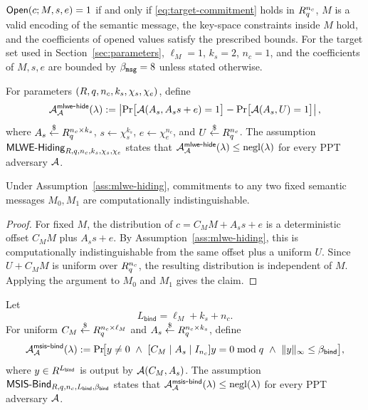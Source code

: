 \begin{definition}\label{def:target-open}
\(\mathsf{Open}(c;M,s,e)=1\) if and only if \eqref{eq:target-commitment} holds in \(R_q^{n_c}\), \(M\) is a valid
encoding of the semantic message, the key-space constraints inside \(M\) hold, and the coefficients of opened values
satisfy the prescribed bounds.  For the target set used in Section~\ref{sec:parameters}, \(\ell_M=1\), \(k_s=2\),
\(n_c=1\), and the coefficients of \(M,s,e\) are bounded by \(\beta_{\mathtt{msg}}=8\) unless stated otherwise.
\end{definition}

\begin{definition}\label{ass:mlwe-hiding}
For parameters \((R,q,n_c,k_s,\chi_s,\chi_e)\), define
\[
  \mathcal{A}^{\mathsf{mlwe\mbox{-}hide}}_{\mathcal{A}}(\lambda)
  :=
  \left|
    \Pr\bigl[\mathcal{A}(A_s,A_s s+e)=1\bigr]
    -
    \Pr\bigl[\mathcal{A}(A_s,U)=1\bigr]
  \right|,
\]
where \(A_s\overset{\$}{\leftarrow}R_q^{n_c\times k_s}\), \(s\leftarrow\chi_s^{k_s}\), \(e\leftarrow\chi_e^{n_c}\), and
\(U\overset{\$}{\leftarrow}R_q^{n_c}\).  The assumption
\(\mathsf{MLWE}\text{-}\mathsf{Hiding}_{R,q,n_c,k_s,\chi_s,\chi_e}\) states that
\(\mathcal{A}^{\mathsf{mlwe\mbox{-}hide}}_{\mathcal{A}}(\lambda)\le\mathrm{negl}(\lambda)\) for every PPT adversary \(\mathcal{A}\).
\end{definition}

\begin{lemma}\label{lem:commit-hiding}
Under Assumption~\ref{ass:mlwe-hiding}, commitments to any two fixed semantic messages \(M_0,M_1\) are
computationally indistinguishable.
\end{lemma}

\begin{proof}
For fixed \(M\), the distribution of \(c=C_MM+A_s s+e\) is a deterministic offset \(C_MM\) plus
\(A_s s+e\).  By Assumption~\ref{ass:mlwe-hiding}, this is computationally indistinguishable from the same offset
plus a uniform \(U\).  Since \(U+C_MM\) is uniform over \(R_q^{n_c}\), the resulting distribution is independent of
\(M\).  Applying the argument to \(M_0\) and \(M_1\) gives the claim.
\end{proof}

\begin{definition}\label{ass:msis-binding}
Let
\[
  L_{\mathsf{bind}}=\ell_M+k_s+n_c.
\]
For uniform \(C_M\overset{\$}{\leftarrow}R_q^{n_c\times\ell_M}\) and \(A_s\overset{\$}{\leftarrow}R_q^{n_c\times k_s}\), define
\[
  \mathcal{A}^{\mathsf{msis\mbox{-}bind}}_{\mathcal{A}}(\lambda)
  :=
  \Pr\!\bigl[
    y\neq 0\ \wedge\ [C_M\mid A_s\mid I_{n_c}]y=0\bmod q\ \wedge\
    \|y\|_\infty\le \beta_{\mathsf{bind}}
  \bigr],
\]
where \(y\in R^{L_{\mathsf{bind}}}\) is output by \(\mathcal{A}(C_M,A_s)\).  The assumption
\(\mathsf{MSIS}\text{-}\mathsf{Bind}_{R,q,n_c,L_{\mathsf{bind}},\beta_{\mathsf{bind}}}\) states that
\(\mathcal{A}^{\mathsf{msis\mbox{-}bind}}_{\mathcal{A}}(\lambda)\le\mathrm{negl}(\lambda)\) for every PPT adversary \(\mathcal{A}\).
\end{definition}

